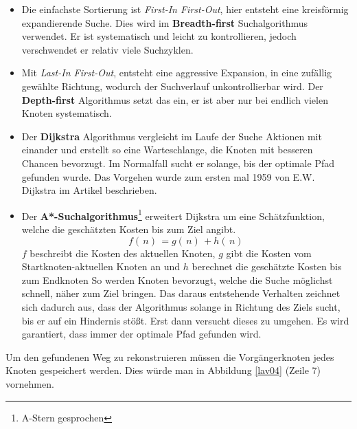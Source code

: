 	\begin{itemize}
		\item Die einfachste Sortierung ist \textit{First-In First-Out}, hier entsteht eine kreisförmig expandierende Suche. Dies wird im \textbf{Breadth-first} Suchalgorithmus verwendet. Er ist systematisch und leicht zu kontrollieren, jedoch verschwendet er relativ viele Suchzyklen\cite[~S. 35]{Lav06}.
		\item Mit \textit{Last-In First-Out}, entsteht eine aggressive Expansion, in eine zufällig gewählte Richtung, wodurch der Suchverlauf unkontrollierbar wird. Der \textbf{Depth-first} Algorithmus setzt das ein, er ist aber nur bei endlich vielen Knoten systematisch\cite[~S. 36]{Lav06}.
		\item Der \textbf{Dijkstra} Algorithmus vergleicht im Laufe der Suche Aktionen mit einander und erstellt so eine Warteschlange, die Knoten mit besseren Chancen bevorzugt. Im Normalfall sucht er solange, bis der optimale Pfad gefunden wurde. Das Vorgehen wurde zum ersten mal 1959 von E.W. Dijkstra im Artikel \cite{dijkstra:59} beschrieben.
		\item Der \textbf{A*-Suchalgorithmus}\footnote{A-Stern gesprochen} erweitert Dijkstra um eine Schätzfunktion, welche die geschätzten Kosten bis zum Ziel angibt.
		$$f( \, n ) \, = g ( \, n ) \, + h ( \, n ) \,$$
		$f$ beschreibt die Kosten des aktuellen Knoten, $g$ gibt die Kosten vom Startknoten-aktuellen Knoten an und $h$ berechnet die geschätzte Kosten bis zum Endknoten
		So werden Knoten bevorzugt, welche die Suche möglichst schnell, näher zum Ziel bringen. Das daraus entstehende Verhalten zeichnet sich dadurch aus, dass der Algorithmus solange in Richtung des Ziels sucht, bis er auf ein Hindernis stößt. Erst dann versucht dieses zu umgehen. Es wird garantiert, dass immer der optimale Pfad gefunden wird.\cite[~S. 37]{Lav06}
	\end{itemize}
Um den gefundenen Weg zu rekonstruieren müssen die Vorgängerknoten jedes Knoten gespeichert werden. Dies würde man in Abbildung \ref{lav04} (Zeile 7) vornehmen. 



